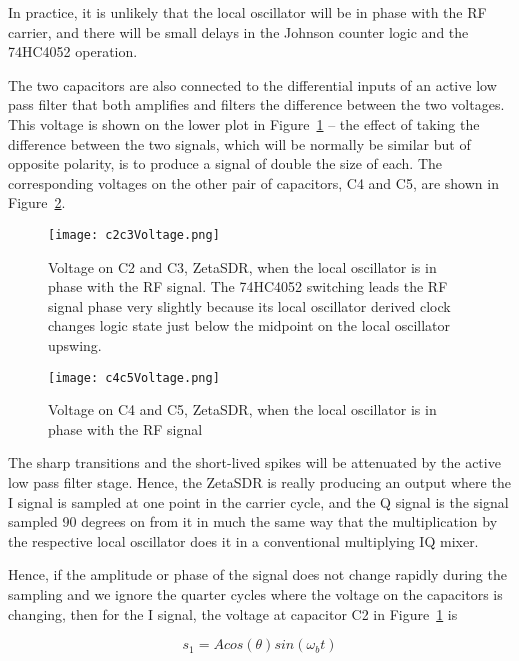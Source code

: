\documentclass[11pt, twoside]{article}
\begin{document}
In practice, it is unlikely that the local oscillator will be in phase
with the RF carrier, and there will be small delays in the Johnson
counter logic and the 74HC4052 operation.

The two capacitors are also connected to the differential inputs of an
active low pass filter that both amplifies and filters the difference
between the two voltages.  This voltage is shown on the lower plot in
Figure~\ref{figure:C2C3simple} -- the effect of taking the difference
between the two signals, which will be normally be similar but of
opposite polarity, is to produce a signal of double the size of each.
The corresponding voltages on the other pair of capacitors, C4 and C5,
are shown in Figure~\ref{figure:C4C5simple}.

\begin{figure}
  \center
  \captionsetup{width=.8\linewidth}
  \texttt{[image: c2c3Voltage.png]}
  \caption{Voltage on C2 and C3, ZetaSDR, when the local
    oscillator is in phase with the RF signal. The 74HC4052 switching
    leads the RF signal phase very slightly because its local
    oscillator derived clock changes logic state just below the
    midpoint on the local oscillator upswing.  }
  \label{figure:C2C3simple}
\end{figure}


\begin{figure}
  \center
  \captionsetup{width=.8\linewidth}
  \texttt{[image: c4c5Voltage.png]}
  \caption{Voltage on C4 and C5, ZetaSDR, when the local
    oscillator is in phase with the RF signal}
  \label{figure:C4C5simple}
\end{figure}

The sharp transitions and the short-lived spikes will be attenuated by
the active low pass filter stage.  Hence, the ZetaSDR is really
producing an output where the I signal is sampled at one point in the
carrier cycle, and the Q signal is the signal sampled 90 degrees on
from it in much the same way that the multiplication by the respective
local oscillator does it in a conventional multiplying IQ mixer.

Hence, if the amplitude or phase of the signal does not change
rapidly during the sampling and we ignore the quarter cycles where the
voltage on the capacitors is changing, then for the I signal, the
voltage at capacitor C2  in Figure~\ref{figure:C2C3simple} is

\begin{equation*}
  s_1 = A cos(\theta) sin({\omega_b}t)
\end{equation*}
\end{document}
